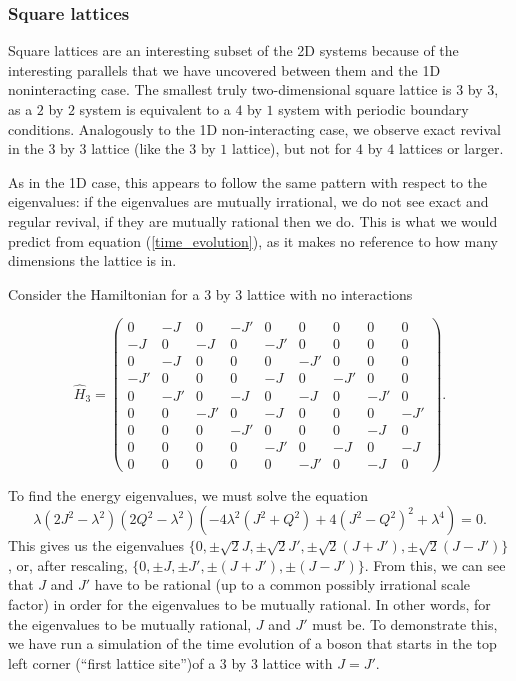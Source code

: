 \documentclass[a4paper,10pt]{article}
\theoremstyle{plain}
\begin{document}
\subsubsection{Square lattices}
Square lattices are an interesting subset of the 2D systems because of the 
interesting parallels that we have uncovered between them and the 1D 
noninteracting case. The smallest truly two-dimensional square lattice is 
$3$ by $3$, as a $2$ by $2$ system is equivalent to a $4$ by $1$ system with
periodic boundary conditions. Analogously to the 1D non-interacting case,
we observe exact revival in the $3$ by $3$ lattice (like the $3$ by $1$ lattice), 
but not for $4$ by $4$ lattices or larger. 

As in the 1D case, this appears to follow the same pattern with respect to the
eigenvalues: if the eigenvalues are mutually irrational, we do not see exact
and regular revival, if they are mutually rational then we do. This is what
we would predict from equation (\ref{time_evolution}), as it makes no 
reference to how many dimensions the lattice is in.

Consider the Hamiltonian for a $3$ by $3$ lattice with no interactions

\begin{equation}
    \hat{H}_{3}
    =
    \begin{pmatrix}
         0& -J&  0& -J'&  0&  0&  0&  0&  0\\
 -J&  0& -J&  0& -J'&  0&  0&  0&  0\\
  0& -J&  0&  0&  0& -J'&  0&  0&  0\\
 -J'&  0&  0&  0& -J&  0& -J'&  0&  0\\
  0& -J'&  0& -J&  0& -J&  0& -J'&  0\\
  0&  0& -J'&  0& -J&  0&  0&  0& -J'\\
  0&  0&  0& -J'&  0&  0&  0& -J&  0\\
  0&  0&  0&  0& -J'&  0& -J&  0& -J\\
  0&  0&  0&  0&  0& -J'&  0& -J&  0

    \end{pmatrix}.
\end{equation}

To find the energy eigenvalues, we must solve the equation
\begin{equation}
 \lambda\left(2J^2-\lambda^2\right)
 \left(2Q^2-\lambda^2\right)
 \left(-4\lambda^2\left(J^2+Q^2\right)
 +
 4\left(J^2-Q^2\right)^2
 +
 \lambda^4\right)
 =
 0.
\end{equation}
This gives us the eigenvalues 
$\lbrace 
0,
\pm\sqrt{2}J,
\pm\sqrt{2}J',
\pm \sqrt{2}(J+J'),
\pm \sqrt{2}(J-J')
\rbrace$,
or, after rescaling,
$\lbrace 
0,
\pm J,
\pm J',
\pm (J+J'),
\pm (J-J')
\rbrace$. 
From this, we can see that $J$ and $J'$ have to be rational (up to a common 
possibly irrational scale factor) in order for the eigenvalues to be mutually
rational. In other words, for the eigenvalues to be mutually rational,
$J$ and $J'$ must be. To demonstrate this, we have run a simulation of the 
time evolution of a boson that starts in the top left corner (``first lattice 
site'')of a $3$ by $3$ lattice with $J=J'$. 
\end{document}
